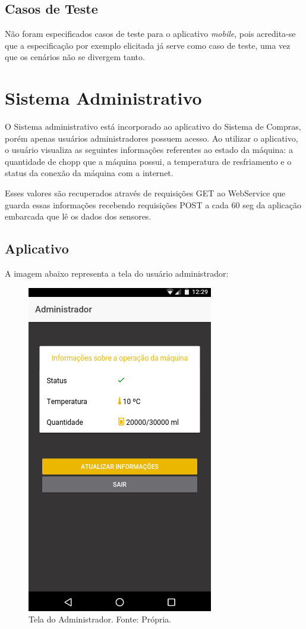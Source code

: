 \subsection{Casos de Teste}

Não foram especificados casos de teste para o aplicativo \textit{mobile}, pois acredita-se que a especificação por exemplo elicitada já serve como caso de teste, uma vez que os cenários não se divergem tanto.

\section[Sistema Administrativo]{Sistema Administrativo}

O Sistema administrativo está incorporado ao aplicativo do Sistema de Compras, porém apenas usuários administradores possuem acesso. Ao utilizar o aplicativo, o usuário visualiza as seguintes informações referentes ao estado da máquina: a quantidade de chopp que a máquina possui, a temperatura de resfriamento e o status da conexão da máquina com a internet.

Esses valores são recuperados através de requisições GET ao WebService que guarda essas informações recebendo requisições POST a cada 60 seg da aplicação embarcada que lê os dados dos sensores. 

\subsection{Aplicativo}

A imagem abaixo representa a tela do usuário administrador:

\begin{figure}[!htb]
    \centering
    \includegraphics[scale= 0.4]{figuras/Aplicativo/admin.png}        
    \caption{Tela do Administrador. Fonte: Própria.}    
    \label{home-page}
\end{figure}

